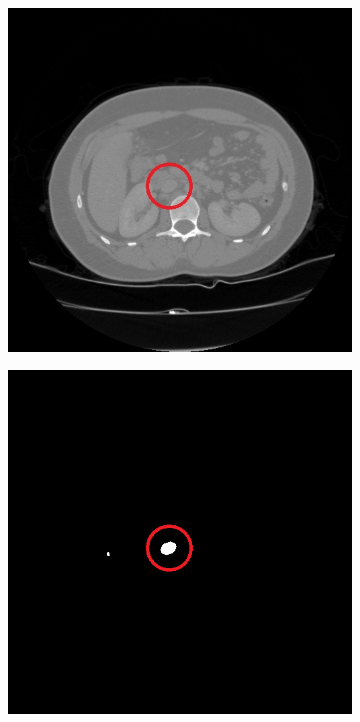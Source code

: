 \begin{figure}[h!]
\begin{subfigure}[b]{0.475\textwidth}
			\caption{}
			\label{fig:miss_label_patient_2_mask_74}
		\end{subfigure}\\[5mm]
		\begin{subfigure}[b]{0.475\textwidth}
			\includegraphics[width=\textwidth]{figures/miss_label_patient_2_dicom_75}
			\caption{}
			\label{fig:miss_label_patient_2_dicom_75}
		\end{subfigure}
		\hfill
		\begin{subfigure}[b]{0.475\textwidth}
			\includegraphics[width=\textwidth]{figures/miss_label_patient_2_mask_75}

\end{subfigure}
\end{figure}
